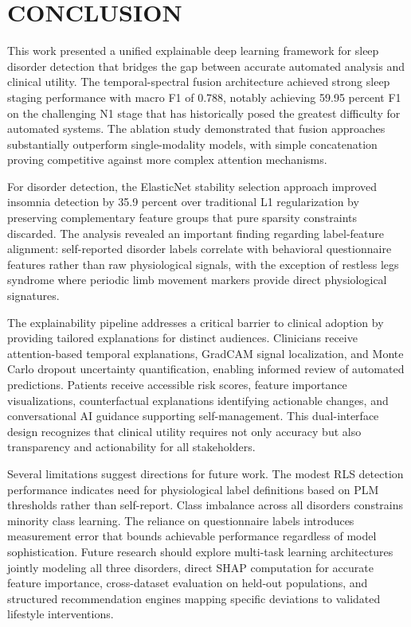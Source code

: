 \documentclass{ieeetj}
\begin{document}
\section{CONCLUSION}

This work presented a unified explainable deep learning framework for sleep disorder detection that bridges the gap between accurate automated analysis and clinical utility. The temporal-spectral fusion architecture achieved strong sleep staging performance with macro F1 of 0.788, notably achieving 59.95 percent F1 on the challenging N1 stage that has historically posed the greatest difficulty for automated systems. The ablation study demonstrated that fusion approaches substantially outperform single-modality models, with simple concatenation proving competitive against more complex attention mechanisms.

For disorder detection, the ElasticNet stability selection approach improved insomnia detection by 35.9 percent over traditional L1 regularization by preserving complementary feature groups that pure sparsity constraints discarded. The analysis revealed an important finding regarding label-feature alignment: self-reported disorder labels correlate with behavioral questionnaire features rather than raw physiological signals, with the exception of restless legs syndrome where periodic limb movement markers provide direct physiological signatures.

The explainability pipeline addresses a critical barrier to clinical adoption by providing tailored explanations for distinct audiences. Clinicians receive attention-based temporal explanations, GradCAM signal localization, and Monte Carlo dropout uncertainty quantification, enabling informed review of automated predictions. Patients receive accessible risk scores, feature importance visualizations, counterfactual explanations identifying actionable changes, and conversational AI guidance supporting self-management. This dual-interface design recognizes that clinical utility requires not only accuracy but also transparency and actionability for all stakeholders.

Several limitations suggest directions for future work. The modest RLS detection performance indicates need for physiological label definitions based on PLM thresholds rather than self-report. Class imbalance across all disorders constrains minority class learning. The reliance on questionnaire labels introduces measurement error that bounds achievable performance regardless of model sophistication. Future research should explore multi-task learning architectures jointly modeling all three disorders, direct SHAP computation for accurate feature importance, cross-dataset evaluation on held-out populations, and structured recommendation engines mapping specific deviations to validated lifestyle interventions.
\end{document}
